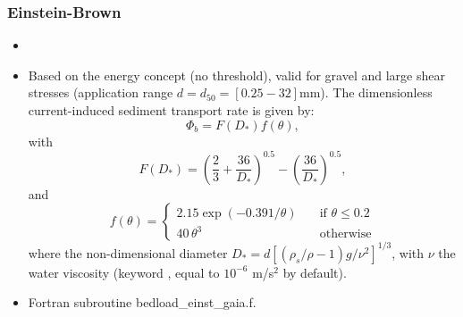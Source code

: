 \subsubsection{Einstein-Brown}
\begin{itemize}
\item {}
\item Based on the energy concept (no threshold), valid for gravel and large shear
stresses (application range $d=d_{50} = [0.25-32]$mm). The dimensionless current-induced sediment transport rate is given by:
\begin{equation*}
\Phi_b = F(D_*)f(\theta),
\end{equation*}
with
\begin{equation*}\label{eq:EinsteinFDs}
F(D_*) = \left(\frac{2}{3} +\frac{36}{D_*}\right)^{0.5} - \left( \frac{36}{D_*}\right)^{0.5},
\end{equation*}
and
\begin{equation*}
f(\theta)=\left\{\begin{array}{ll}
2.15\exp(-0.391/\theta) & \quad\text{if}\,\,\theta \leq 0.2 \\
40\,\theta^{3}          & \quad\text{otherwise}
\end{array}
\right.
\end{equation*}
where the non-dimensional diameter $D_*=d[(\rho_s/\rho-1)g/\nu^2]^{1/3}$, with $\nu$ the water viscosity (keyword , equal to $10^{-6}$ m/s$^2$ by default).
\item Fortran subroutine {\ttfamily bedload\_einst\_gaia.f}.
\end{itemize}

